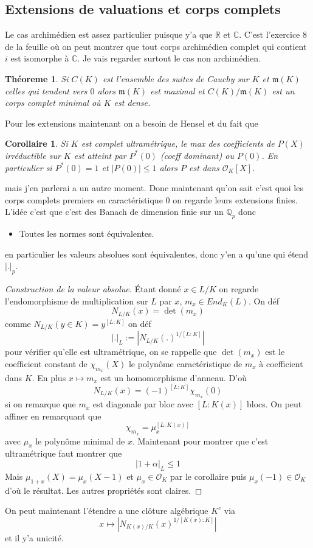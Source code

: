 \documentclass[a4paper,12pt]{book}
\newcommand{\R}{\mathbb{R}}
\newcommand{\Q}{\mathbb{Q}}
\newcommand{\C}{\mathbb{C}}
\newcommand{\Or}{\mathcal{O}}
\newcommand{\m}{\mathfrak m}
\theoremstyle{plain}
\newtheorem{thm}{Théoreme}
\newtheorem{cor}{Corollaire}
\theoremstyle{definition}
\theoremstyle{remark}
\begin{document}
\subsection*{Extensions de valuations et corps complets}
Le cas archimédien est assez particulier puisque y'a que $\R$ et $\C$.
C'est l'exercice $8$ de la feuille où on peut montrer que tout corps
archimédien complet qui contient $i$ est isomorphe à $\C$. Je
vais regarder surtout le cas non archimédien.
\begin{thm}
    Si $C(K)$ est l'ensemble des suites de Cauchy sur $K$ et $\m(K)$
    celles qui tendent vers $0$ alors $\m(K)$ est maximal et
    $C(K)/\m(K)$ est un corps complet minimal où $K$ est dense.
\end{thm}
Pour les extensions maintenant on a besoin de Hensel et du fait que
\begin{cor}
    Si $K$ est complet ultramétrique, le max des coefficients de $P(X)$
    irréductible sur $K$ est atteint par $P^*(0)$ (coeff dominant)
    ou $P(0)$. En particulier si $P^*(0)=1$ et $|P(0)|\leq 1$ alors
    $P$ est dans $\Or_K[X]$.
\end{cor}
mais j'en parlerai a un autre moment. Donc maintenant qu'on sait c'est
quoi les corps complets premiers en caractéristique $0$ on regarde
leurs extensions finies. L'idée c'est que c'est des Banach de dimension
finie sur un $\Q_p$ donc
\begin{itemize}
    \item Toutes les normes sont équivalentes.
\end{itemize}
en particulier les valeurs absolues sont équivalentes, donc y'en a 
qu'une qui étend $|.|_p$.

\begin{proof}[Construction de la valeur absolue]
    
Étant donné $x\in L/K$ on regarde 
l'endomorphisme de multiplication sur $L$ par $x$, $m_x\in End_K(L)$.
On déf 
\[N_{L/K}(x)=\det(m_x)\]
comme $N_{L/K}(y\in K)=y^{[L:K]}$ on déf 
\[|.|_L:=|N_{L/K}(.)^{1/[L:K]}|\]
pour vérifier qu'elle est ultramétrique, on se rappelle que $\det(m_x)$
est le coefficient constant de $\chi_{m_x}(X)$ le polynôme 
caractéristique de $m_x$ à coefficient dans $K$. En plus 
$x\mapsto m_x$ est un homomorphisme d'anneau. D'où 
\[N_{L/K}(x)=(-1)^{[L:K]}\chi_{m_x}(0)\]
si on remarque que $m_x$ est diagonale par bloc avec $[L:K(x)]$
blocs. On peut affiner en remarquant que 
\[\chi_{m_x}=\mu_{x}^{[L:K(x)]}\]
avec $\mu_x$ le polynôme minimal de $x$. Maintenant pour montrer que
c'est ultramétrique faut montrer que 
\[|1+\alpha|_L\leq 1\]
Mais $\mu_{1+x}(X)=\mu_{x}(X-1)$ et $\mu_x\in \Or_K$ par le corollaire 
puis $\mu_x(-1)\in \Or_K$ d'où le résultat. Les autres propriétés sont
claires.
\end{proof}
On peut maintenant l'étendre a une clôture algébrique $K^c$ via
\[x\mapsto |N_{K(x)/K}(x)^{1/[K(x):K]}|\]
et il y'a unicité.
\end{document}
